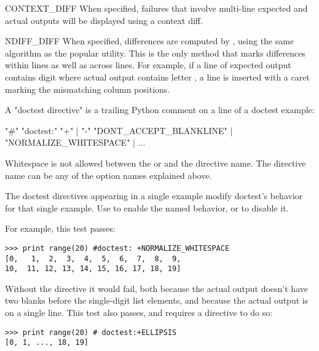 \begin{datadesc}{CONTEXT_DIFF}
    When specified, failures that involve multi-line expected and
    actual outputs will be displayed using a context diff.
\end{datadesc}

\begin{datadesc}{NDIFF_DIFF}
    When specified, differences are computed by ,
    using the same algorithm as the popular  utility.
    This is the only method that marks differences within lines as
    well as across lines.  For example, if a line of expected output
    contains digit  where actual output contains letter ,
    a line is inserted with a caret marking the mismatching column
    positions.
\end{datadesc}

A "doctest directive" is a trailing Python comment on a line of a doctest
example:

\begin{productionlist}[doctest]
               {"\#" "doctest:"  }
               {"+" | "-"}
               {"DONT_ACCEPT_BLANKLINE" | "NORMALIZE_WHITESPACE" | ...}
\end{productionlist}

Whitespace is not allowed between the \code{+} or \code{-} and the
directive name.  The directive name can be any of the option names
explained above.

The doctest directives appearing in a single example modify doctest's
behavior for that single example.  Use \code{+} to enable the named
behavior, or \code{-} to disable it.

For example, this test passes:

\begin{verbatim}
>>> print range(20) #doctest: +NORMALIZE_WHITESPACE
[0,   1,  2,  3,  4,  5,  6,  7,  8,  9,
10,  11, 12, 13, 14, 15, 16, 17, 18, 19]
\end{verbatim}

Without the directive it would fail, both because the actual output
doesn't have two blanks before the single-digit list elements, and
because the actual output is on a single line.  This test also passes,
and requires a directive to do so:

\begin{verbatim}
>>> print range(20) # doctest:+ELLIPSIS
[0, 1, ..., 18, 19]
\end{verbatim}

